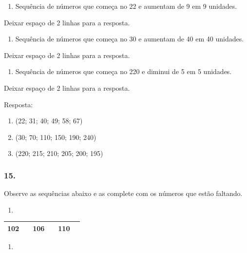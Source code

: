 \begin{enumerate}
\def\labelenumi{\alph{enumi})}
\item
  Sequência de números que começa no 22 e aumentam de 9 em 9 unidades.
\end{enumerate}

Deixar espaço de 2 linhas para a resposta.

\begin{enumerate}
\def\labelenumi{\alph{enumi})}
\item
  Sequência de números que começa no 30 e aumentam de 40 em 40 unidades.
\end{enumerate}

Deixar espaço de 2 linhas para a resposta.

\begin{enumerate}
\def\labelenumi{\alph{enumi})}
\item
  Sequência de números que começa no 220 e diminui de 5 em 5 unidades.
\end{enumerate}

Deixar espaço de 2 linhas para a resposta.

Resposta:

\begin{enumerate}
\def\labelenumi{\alph{enumi})}
\item
  (22; 31; 40; 49; 58; 67)
\item
  (30; 70; 110; 150; 190; 240)
\item
  (220; 215; 210; 205; 200; 195)
\end{enumerate}

\subsubsection{15.}\label{section-47}

Observe as sequências abaixo e as complete com os números que estão
faltando.

\begin{enumerate}
\def\labelenumi{\alph{enumi})}
\item
\end{enumerate}

\begin{longtable}[]{@{}llllll@{}}
\toprule
102 & & 106 & & 110 &\tabularnewline
\bottomrule
\end{longtable}

\begin{enumerate}
\def\labelenumi{\alph{enumi})}
\item
\end{enumerate}

